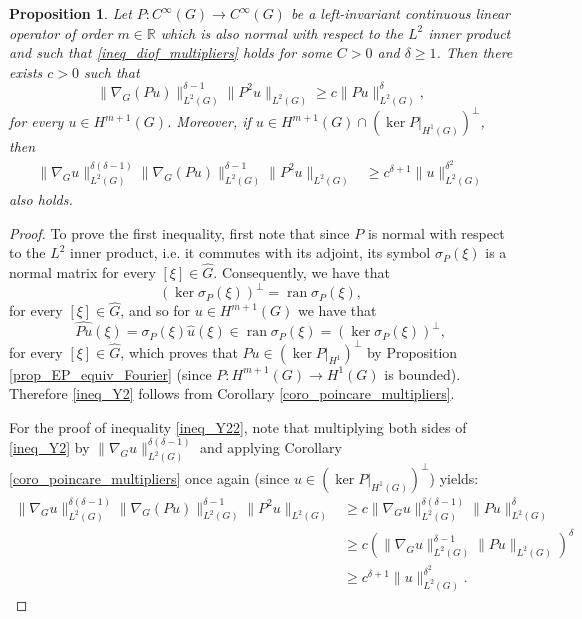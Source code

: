 \documentclass[11pt]{amsart}
\numberwithin{theorem}{section}
\numberwithin{equation}{section}
\newtheorem{prop}[theorem]{Proposition}
\theoremstyle{definition}
\numberwithin{example}{section}
\theoremstyle{definition}
\theoremstyle{definition}
\newcommand{\R}{\mathbb{R}}
\begin{document}
\begin{prop}\label{prop_composed_ineq_general}
Let $P:C^\infty(G)\to C^\infty(G)$ be a left-invariant continuous linear operator of order $m\in\R$ which is also normal with respect to the $L^2$ inner product and such that \eqref{ineq_diof_multipliers} holds for some $C>0$ and $\delta\geq 1$. Then there exists  $c>0$ such that
        \begin{equation}\label{ineq_Y2}
            \|\nabla_G (Pu)\|_{L^2(G)}^{\delta-1}\|P^2u\|_{L^2(G)}\geq c\|Pu\|_{L^2(G)}^\delta,
        \end{equation}
        for every $u\in H^{m+1}(G)$. Moreover, if $u\in H^{m+1}(G)\cap (\ker P|_{H^{1}(G)})^\perp$, then 
         \begin{align}\label{ineq_Y22}
        \|\nabla_G u\|^{\delta(\delta-1)}_{L^2(G)} \|\nabla_G (Pu)\|_{L^2(G)}^{\delta-1}\|P^2u\|_{L^2(G)}&\geq c^{\delta+1}\|u\|_{L^2(G)}^{\delta^2}
    \end{align}
    also holds.
\end{prop}
\begin{proof}
To prove the first inequality, first note that since $P$ is normal with respect to the $L^2$ inner product, i.e. it commutes with its adjoint, its symbol $\sigma_P(\xi)$ is a  normal matrix for every $[\xi]\in\widehat{G}$. Consequently, we have that 
    \begin{equation*}
        (\ker \sigma_P(\xi))^\perp=\operatorname{ran}\sigma_P(\xi),
    \end{equation*}
    for every $[\xi]\in\widehat{G}$, and so for $u\in H^{m+1}(G)$ we have that
\begin{equation*}
    \widehat{Pu}(\xi)=\sigma_P(\xi)\widehat{u}(\xi)\in\operatorname{ran}\sigma_P(\xi)=(\ker \sigma_P(\xi))^\perp,
\end{equation*}
for every $[\xi]\in\widehat{G}$, which proves that $Pu\in (\ker P|_{H^{1}})^\perp$ by Proposition \ref{prop_EP_equiv_Fourier}  (since $P:H^{m+1}(G)\to H^{1}(G)$ is bounded). Therefore \eqref{ineq_Y2} follows from Corollary  \ref{coro_poincare_multipliers}.

 For the proof of inequality \eqref{ineq_Y22}, note that multiplying both sides of \eqref{ineq_Y2} by $ \|\nabla_G u\|^{\delta(\delta-1)}_{L^2(G)}$ and applying Corollary  \ref{coro_poincare_multipliers} once again (since $u\in (\ker P|_{H^{1}(G)})^\perp$) yields:
    \begin{align*}
        \|\nabla_G u\|^{\delta(\delta-1)}_{L^2(G)} \|\nabla_G (Pu)\|_{L^2(G)}^{\delta-1}\|P^2u\|_{L^2(G)}&\geq c\|\nabla_G u\|^{\delta(\delta-1)}_{L^2(G)} \|Pu\|_{L^2(G)}^\delta\\
        &\geq c\left(\|\nabla_G u\|^{\delta-1}_{L^2(G)} \|Pu\|_{L^2(G)}\right)^\delta\\
        &\geq c^{\delta+1}\|u\|_{L^2(G)}^{\delta^2}.
    \end{align*}
\end{proof}
\end{document}
